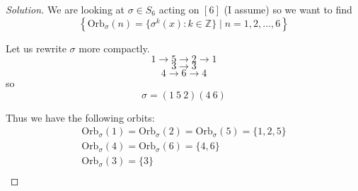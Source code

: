 \begin{proof}[Solution]
    We are looking at $\sigma \in S_6$ acting on $[6]$ (I assume)
    so we want to find 
    \[
        \left\{ 
            \text{Orb}_\sigma(n) = \{\sigma^k(x) : 
            k \in \mathbb Z\} 
            \mid n = 1, 2, \ldots, 6
        \right\}
    \]

    Let us rewrite $\sigma$ more compactly. 
    \[
        1 \to 5 \to 2 \to 1 
    \]
    \[
        3 \to 3 
    \]
    \[
        4 \to 6 \to 4
    \]
    so 
    \[
        \sigma = (1 \ 5 \ 2)(4 \ 6)
    \]
    
    Thus we have the following orbits: 
    \begin{align*}
        \text{Orb}_\sigma(1) = \text{Orb}_\sigma(2) = 
        \text{Orb}_\sigma(5) = \{1,2,5\} \\ 
        \text{Orb}_\sigma(4) = \text{Orb}_\sigma(6) = \{4,6\} \\
        \text{Orb}_\sigma(3) = \{3\} \\ 
    \end{align*}
\end{proof}

